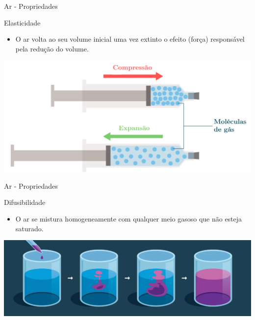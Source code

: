 \begin{frame}{Ar - Propriedades}
	\begin{block}{Elasticidade}
		\begin{itemize}
			\item O ar volta ao seu volume inicial uma vez extinto o efeito (força) responsável pela redução do volume.
		\end{itemize}
	\end{block}
\centering
\includegraphics[width=1\linewidth]{Figuras/Ch11/fig10}
\end{frame}


\begin{frame}{Ar - Propriedades}
	\begin{block}{Difusibilidade}
		\begin{itemize}
			\item O ar se mistura homogeneamente com qualquer meio gasoso que não esteja saturado.
		\end{itemize}
	\end{block}
\vspace{0.5cm}

\centering
\includegraphics[width=1\linewidth]{Figuras/Ch11/fig11}
\end{frame}


